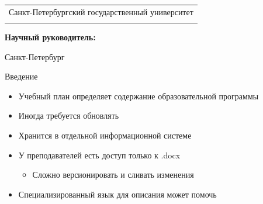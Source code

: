 \documentclass
  [ russian
  , aspectratio=1610 %
  ] {beamer}
\title[Короткое название]{\my@title@title@ru}
\author[\my@title@author@ru]{\my@title@author@ru, группа \academicGroup}
\institute[СПбГУ]{}
\date[9 сентября 2024 г.]{}
\makeatletter
\newcommand{\advisorChair}{\my@title@chair@ru}
\newcommand{\supervisor}{\my@title@supervisor@ru}
\newcommand{\supervisorPosition}{\my@title@supervisorPosition@ru}
\newcommand{\consultant}{\my@title@consultant@ru}
\newcommand{\consultantPosition}{\my@title@consultantPosition@ru}
\newcommand{\reviewer}{\my@title@reviewer@ru}
\newcommand{\reviewerPosition}{\my@title@reviewerPosition@ru}
\newcommand{\defenseYear}{\my@title@year@ru}
\makeatother
\begin{document}
{

\begin{frame}
    \vspace{15pt}
    \begin{center}
        \begin{tabular}{c}
            \scriptsize{Санкт-Петербургский государственный университет} \\
            \scriptsize{\advisorChair}
        \end{tabular}
        \titlepage
    \end{center}

    \btVFill

    {\scriptsize
        \textbf{Научный руководитель:}  \supervisorPosition~\supervisor
    }
    \makeatother
    \begin{center}
        \vspace{5pt}
        \scriptsize{Санкт-Петербург\\ \defenseYear}
    \end{center}
\end{frame}
}

\begin{frame}{Введение}
    \begin{itemize}
        \item Учебный план определяет содержание образовательной программы
        \item Иногда требуется обновлять
        \item Хранится в отдельной информационной системе
        \item У преподавателей есть доступ только к .docx
              \begin{itemize}
                  \item Сложно версионировать и сливать изменения
              \end{itemize}
        \item Специализированный язык для описания может помочь
    \end{itemize}
\end{frame}
\end{document}
